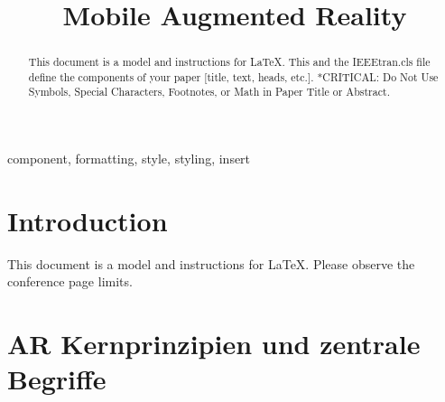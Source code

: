 \documentclass[conference]{IEEEtran}
\begin{document}
\title{Mobile Augmented Reality\\
}

\author{
}

\maketitle

\begin{abstract}
This document is a model and instructions for \LaTeX.
This and the IEEEtran.cls file define the components of your paper [title, text, heads, etc.]. *CRITICAL: Do Not Use Symbols, Special Characters, Footnotes, 
or Math in Paper Title or Abstract.
\end{abstract}

\begin{IEEEkeywords}
component, formatting, style, styling, insert
\end{IEEEkeywords}

\section{Introduction}
This document is a model and instructions for \LaTeX.
Please observe the conference page limits. 



\section{AR Kernprinzipien und zentrale Begriffe}






\renewcommand*{\bibfont}{\small}
\printbibliography
\end{document}
